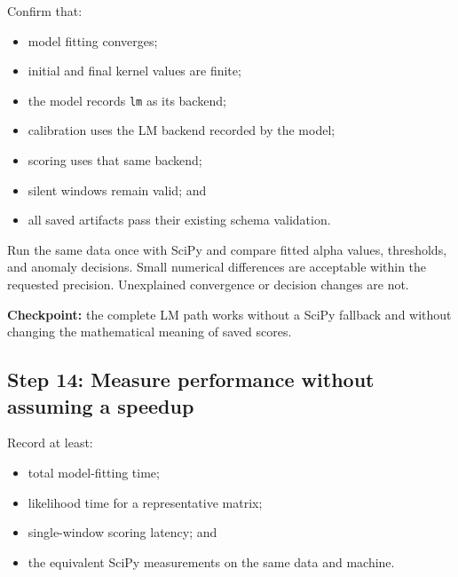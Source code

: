 \documentclass[11pt,a4paper]{article}
\begin{document}
Confirm that:

\begin{itemize}

\item model fitting converges;

\item initial and final kernel values are finite;

\item the model records \texttt{lm} as its backend;

\item calibration uses the LM backend recorded by the model;

\item scoring uses that same backend;

\item silent windows remain valid; and

\item all saved artifacts pass their existing schema validation.

\end{itemize}

Run the same data once with SciPy and compare fitted alpha values, thresholds,
and anomaly decisions. Small numerical differences are acceptable within the
requested precision. Unexplained convergence or decision changes are not.

\textbf{Checkpoint:} the complete LM path works without a SciPy fallback and
without changing the mathematical meaning of saved scores.

\subsection{Step 14: Measure performance without assuming a speedup}

Record at least:

\begin{itemize}

\item total model-fitting time;

\item likelihood time for a representative matrix;

\item single-window scoring latency; and

\item the equivalent SciPy measurements on the same data and machine.

\end{itemize}
\end{document}
